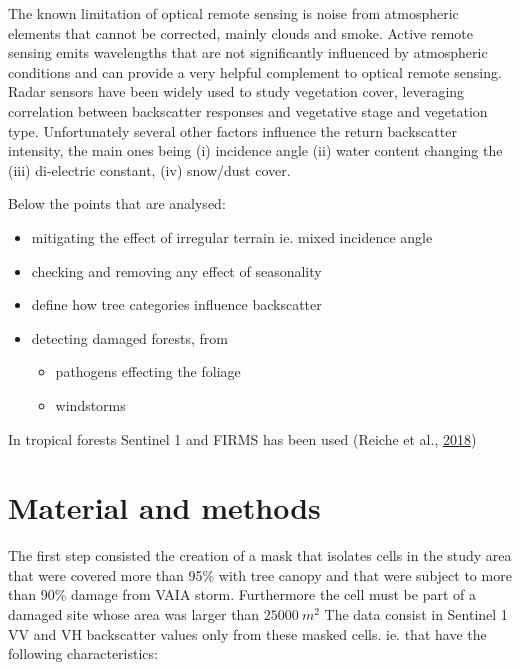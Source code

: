 \documentclass[]{elsarticle} %
\providecommand{\tightlist}{%
  \setlength{\itemsep}{0pt}\setlength{\parskip}{0pt}}
\begin{document}
The known limitation of optical remote sensing is noise from atmospheric
elements that cannot be corrected, mainly clouds and smoke. Active
remote sensing emits wavelengths that are not significantly influenced
by atmospheric conditions and can provide a very helpful complement to
optical remote sensing. Radar sensors have been widely used to study
vegetation cover, leveraging correlation between backscatter responses
and vegetative stage and vegetation type. Unfortunately several other
factors influence the return backscatter intensity, the main ones being
(i) incidence angle (ii) water content changing the (iii) di-electric
constant, (iv) snow/dust cover.

Below the points that are analysed:

\begin{itemize}
\tightlist
\item
  mitigating the effect of irregular terrain ie. mixed incidence angle
\item
  checking and removing any effect of seasonality
\item
  define how tree categories influence backscatter
\item
  detecting damaged forests, from

  \begin{itemize}
  \tightlist
  \item
    pathogens effecting the foliage
  \item
    windstorms
  \end{itemize}
\end{itemize}

In tropical forests Sentinel 1 and FIRMS has been used (Reiche et al.,
\protect\hyperlink{ref-Reiche2018}{2018})

\hypertarget{material-and-methods}{%
\section{Material and methods}\label{material-and-methods}}

The first step consisted the creation of a mask that isolates cells in
the study area that were covered more than 95\% with tree canopy and
that were subject to more than 90\% damage from VAIA storm. Furthermore
the cell must be part of a damaged site whose area was larger than
\(25000\ m^2\) The data consist in Sentinel 1 VV and VH backscatter
values only from these masked cells. ie. that have the following
characteristics:
\end{document}

